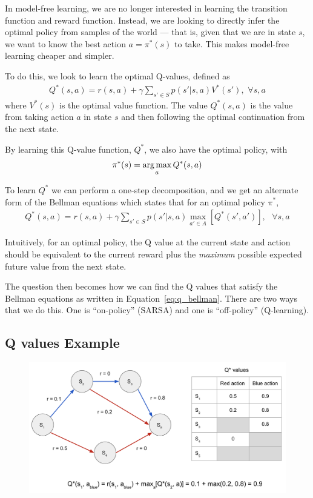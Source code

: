 \documentclass[12pt]{article}
\begin{document}
In model-free learning, we are no longer interested in learning the
transition function and reward function. Instead, we are looking to
directly infer the optimal policy from samples of the world --- that
is, given that we are in state $s$, we want to know the best action
$a = \pi^*(s)$ to take. This makes model-free learning cheaper and
simpler.

To do this, we look to learn the optimal Q-values, defined as
%
\begin{align}
  Q^*(s,a)=r(s,a)+\gamma\sum_{s' \in S}p(s' | s, a) V^*(s'), \text{
  } \forall s,a
\end{align}
where $V^*(s)$ is the optimal value function.  The value $Q^*(s,a)$ is
the value from taking action $a$ in state $s$ and then following the
optimal continuation from the next state.

By learning this Q-value function, $Q^*$, we also have the optimal
policy, with
%
\begin{align}
    \pi^*(s) = \argmax_aQ^*(s, a)
\end{align}

To learn $Q^*$ we can perform a one-step decomposition, and we get an
alternate form of the Bellman equations which states that for an
optimal policy $\pi^*$,
%
\begin{align}
    Q^*(s,a) = r(s,a) + \gamma\sum_{s' \in S}p(s' | s, a)\max_{a' \in A}[Q^*(s', a')], \text{  } \forall s,a \label{eq:q_bellman}
\end{align}


Intuitively, for an optimal policy, the Q value at the current state and action should be equivalent to the current reward plus the \emph{maximum} possible expected future value from the next state. 


The question then becomes how we can find the Q values that satisfy the Bellman equations as written in Equation~\ref{eq:q_bellman}. There are two ways that we do this. One is ``on-policy'' (SARSA) and one is ``off-policy'' (Q-learning).


\subsection{Q values Example}
\begin{figure}[!h]
  \centering
  \includegraphics[width=1.0\linewidth]{optimal_qs_example.png}
\end{figure}
\end{document}
